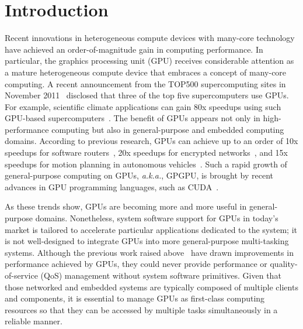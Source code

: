 \vspace{-0.5em}
\section{Introduction}
\label{sec:introduction}
\vspace{-0.25em}

Recent innovations in heterogeneous compute devices with many-core
technology have achieved an order-of-magnitude gain in computing
performance. 
In particular, the graphics processing unit (GPU) receives considerable
attention as a mature heterogeneous compute device that embraces a
concept of many-core computing.
A recent announcement from the TOP500 supercomputing sites in November
2011~\cite{TOP500} disclosed that three of the top five supercomputers
use GPUs.
For example, scientific climate applications can gain 80x speedups using
such GPU-based supercomputers~\cite{Shimokawabe10}.
The benefit of GPUs appears not only in high-performance computing but
also in general-purpose and embedded computing domains.
According to previous research, GPUs can achieve up to an order of 10x
speedups for software routers~\cite{Han_SIGCOMM10}, 20x speedups for
encrypted networks~\cite{Jang_NSDI11}, and 15x speedups for motion
planning in autonomous vehicles~\cite{McNaughton_ICRA11}.
Such a rapid growth of general-purpose computing on GPUs,
\textit{a.k.a.}, GPGPU, is brought by recent advances in GPU
programming languages, such as CUDA~\cite{CUDA40}.

As these trends show, GPUs are becoming more and more useful in
general-purpose domains. 
Nonetheless, system software support for GPUs in today's market is
tailored to accelerate particular applications dedicated to the
system; it is not well-designed to integrate GPUs into more
general-purpose multi-tasking systems.
Although the previous work raised above~\cite{Han_SIGCOMM10,
Jang_NSDI11, McNaughton_ICRA11} have drawn improvements in performance
achieved by GPUs, they could never provide performance or
quality-of-service (QoS) management without system software primitives.
Given that those networked and embedded systems are typically composed
of multiple clients and components, it is essential to manage GPUs as
first-class computing resources so that they can be accessed by multiple
tasks simultaneously in a reliable manner.

